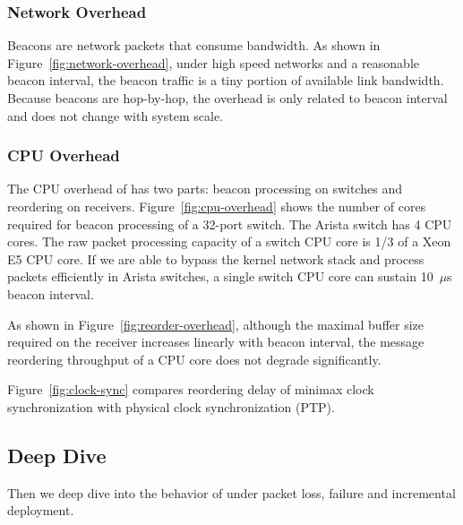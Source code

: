 

\subsubsection{Network Overhead}
\label{sec:eval-overhead}

Beacons are network packets that consume bandwidth.
As shown in Figure~\ref{fig:network-overhead}, under high speed networks and a reasonable beacon interval, the beacon traffic is a tiny portion of available link bandwidth.
Because beacons are hop-by-hop, the overhead is only related to beacon interval and does not change with system scale.

\subsubsection{CPU Overhead}
\label{sec:eval-cpu-overhead}

The CPU overhead of \sys has two parts: beacon processing on switches and reordering on receivers.
Figure~\ref{fig:cpu-overhead} shows the number of cores required for beacon processing of a 32-port switch.
The Arista switch has 4 CPU cores.
The raw packet processing capacity of a switch CPU core is 1/3 of a Xeon E5 CPU core.
If we are able to bypass the kernel network stack and process packets efficiently in Arista switches, a single switch CPU core can sustain 10~$\mu$s beacon interval.

As shown in Figure~\ref{fig:reorder-overhead}, although the maximal buffer size required on the receiver increases linearly with beacon interval, the message reordering throughput of a CPU core does not degrade significantly.


Figure~\ref{fig:clock-sync} compares reordering delay of minimax clock synchronization with physical clock synchronization (PTP).

\subsection{Deep Dive}


Then we deep dive into the behavior of \sys under packet loss, failure and incremental deployment.

